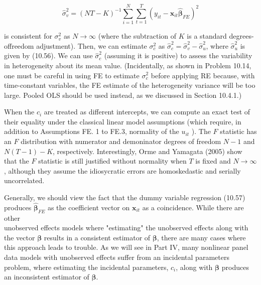 \documentclass[10pt]{article}
\begin{document}
$$
\hat{\sigma}_{v}^{2}=(N T-K)^{-1} \sum_{i=1}^{N} \sum_{t=1}^{T}\left(y_{i t}-\mathbf{x}_{i t} \hat{\boldsymbol{\beta}}_{F E}\right)^{2}
$$

is consistent for $\sigma_{v}^{2}$ as $N \rightarrow \infty$ (where the subtraction of $K$ is a standard degrees-offreedom adjustment). Then, we can estimate $\sigma_{c}^{2}$ as $\hat{\sigma}_{c}^{2}=\hat{\sigma}_{v}^{2}-\hat{\sigma}_{u}^{2}$, where $\hat{\sigma}_{u}^{2}$ is given by (10.56). We can use $\hat{\sigma}_{c}^{2}$ (assuming it is positive) to assess the variability in heterogeneity about its mean value. (Incidentally, as shown in Problem 10.14, one must be careful in using FE to estimate $\sigma_{c}^{2}$ before applying RE because, with time-constant variables, the FE estimate of the heterogeneity variance will be too large. Pooled OLS should be used instead, as we discussed in Section 10.4.1.)

When the $c_{i}$ are treated as different intercepts, we can compute an exact test of their equality under the classical linear model assumptions (which require, in addition to Assumptions FE. 1 to FE.3, normality of the $u_{i t}$ ). The $F$ statistic has an $F$ distribution with numerator and demoninator degrees of freedom $N-1$ and $N(T-1)-K$, respectively. Interestingly, Orme and Yamagata (2005) show that the $F$ statistic is still justified without normality when $T$ is fixed and $N \rightarrow \infty$, although they assume the idiosycratic errors are homoskedastic and serially uncorrelated.

Generally, we should view the fact that the dummy variable regression (10.57) produces $\hat{\boldsymbol{\beta}}_{F E}$ as the coefficient vector on $\mathbf{x}_{i t}$ as a coincidence. While there are other\\
unobserved effects models where "estimating" the unobserved effects along with the vector $\boldsymbol{\beta}$ results in a consistent estimator of $\boldsymbol{\beta}$, there are many cases where this approach leads to trouble. As we will see in Part IV, many nonlinear panel data models with unobserved effects suffer from an incidental parameters problem, where estimating the incidental parameters, $c_{i}$, along with $\boldsymbol{\beta}$ produces an inconsistent estimator of $\boldsymbol{\beta}$.
\end{document}
